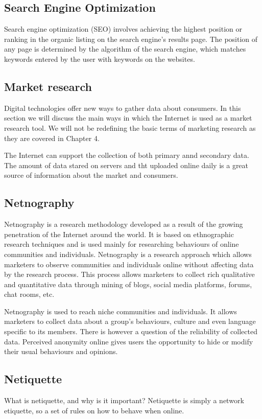 \documentclass{article}
\begin{document}
\subsection{Search Engine Optimization}
Search engine optimization (SEO) involves achieving the highest position or ranking in the organic listing on the search engine's results page. The position of any page is determined by the algorithm of the search engine, which matches keywords entered by the user with keywords on the websites.

\subsection{Market research}
Digital technologies offer new ways to gather data about consumers. In this section we will discuss the main ways in which the Internet is used as a market research tool. We will not be redefining the basic terms of marketing research as they are covered in Chapter 4. 

The Internet can support the collection of both primary annd secondary data. The amount of data stared on servers and tht uploaded online daily is a great source of information about the market and consumers.

\subsection{Netnography}
Netnography is a research methodology developed as a result of the growing penetration of the Internet around the world. It is based on ethnographic research techniques and is used mainly for researching behaviours of online communities and individuals. Netnography is a research approach which allows marketers to observe communities and individuals online without affecting data by the research process. This process allows marketers to collect rich qualitative and quantitative data through mining of blogs, social media platforms, forums, chat rooms, etc.

Netnography is used to reach niche communities and individuals. It allows marketers to collect data about a group's behaviours, culture and even language specific to its members. There is however a question of the reliability of collected data. Perceived anonymity online gives users the opportunity to hide or modify their usual behaviours and opinions.

\subsection{Netiquette}
What is netiquette, and why is it important? Netiquette is simply a network etiquette, so a set of rules on how to behave when online.
\end{document}
